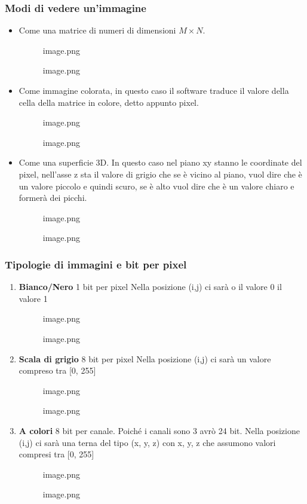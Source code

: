 \documentclass[
]{article}
\begin{document}
\hypertarget{modi-di-vedere-unimmagine}{%
\subsubsection{Modi di vedere un'immagine}\label{modi-di-vedere-unimmagine}}

\begin{itemize}
\item
  Come una matrice di numeri di dimensioni \(M\times N\).

  \begin{figure}
  \centering
  {image.png}
  \caption{image.png}
  \end{figure}
\item
  Come immagine colorata, in questo caso il software traduce il valore della cella della matrice in colore, detto appunto pixel.

  \begin{figure}
  \centering
  {image.png}
  \caption{image.png}
  \end{figure}
\item
  Come una superficie 3D. In questo caso nel piano xy stanno le coordinate del pixel, nell'asse z sta il valore di grigio che se è vicino al piano, vuol dire che è un valore piccolo e quindi scuro, se è alto vuol dire che è un valore chiaro e formerà dei picchi.

  \begin{figure}
  \centering
  {image.png}
  \caption{image.png}
  \end{figure}
\end{itemize}

\hypertarget{tipologie-di-immagini-e-bit-per-pixel}{%
\subsubsection{Tipologie di immagini e bit per pixel}\label{tipologie-di-immagini-e-bit-per-pixel}}

\begin{enumerate}
\def\labelenumi{\arabic{enumi}.}
\item
  \textbf{Bianco/Nero}
  1 bit per pixel
  Nella posizione (i,j) ci sarà o il valore 0 il valore 1

  \begin{figure}
  \centering
  {image.png}
  \caption{image.png}
  \end{figure}
\item
  \textbf{Scala di grigio}
  8 bit per pixel
  Nella posizione (i,j) ci sarà un valore compreso tra {[}0, 255{]}

  \begin{figure}
  \centering
  {image.png}
  \caption{image.png}
  \end{figure}
\item
  \textbf{A colori}
  8 bit per canale. Poiché i canali sono 3 avrò 24 bit.
  Nella posizione (i,j) ci sarà una terna del tipo (x, y, z) con x, y, z che assumono valori compresi tra {[}0, 255{]}

  \begin{figure}
  \centering
  {image.png}
  \caption{image.png}
  \end{figure}
\end{enumerate}
\end{document}
